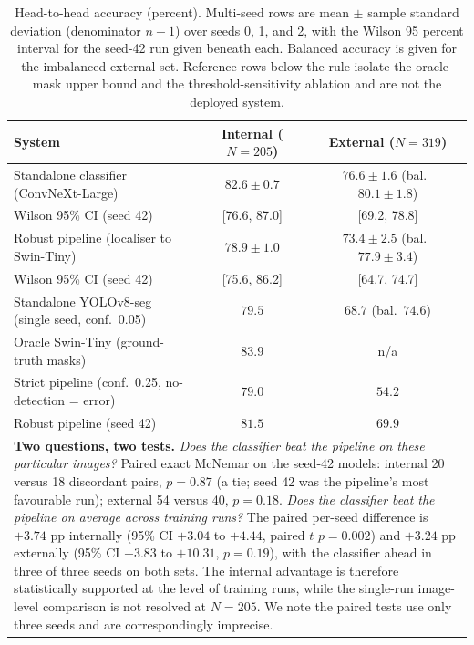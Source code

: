 \documentclass{elektr}
\newcommand{\vs}{\vspace}
\begin{document}
\begin{table}[!ht]
\caption{Head-to-head accuracy (percent). Multi-seed rows are mean $\pm$ sample standard deviation (denominator $n-1$) over seeds 0, 1, and 2, with the Wilson 95 percent interval for the seed-42 run given beneath each. Balanced accuracy is given for the imbalanced external set. Reference rows below the rule isolate the oracle-mask upper bound and the threshold-sensitivity ablation and are not the deployed system.}
\begin{center}
\small
\begin{tabular}{|l|c|c|}
\hline
System & Internal ($N=205$) & External ($N=319$) \\
\hline
Standalone classifier (ConvNeXt-Large) & $82.6 \pm 0.7$ & $76.6 \pm 1.6$ (bal.\ $80.1 \pm 1.8$) \\
\quad Wilson 95\% CI (seed 42) & [76.6, 87.0] & [69.2, 78.8] \\
Robust pipeline (localiser to Swin-Tiny) & $78.9 \pm 1.0$ & $73.4 \pm 2.5$ (bal.\ $77.9 \pm 3.4$) \\
\quad Wilson 95\% CI (seed 42) & [75.6, 86.2] & [64.7, 74.7] \\
Standalone YOLOv8-seg (single seed, conf.\ 0.05) & $79.5$ & $68.7$ (bal.\ $74.6$) \\
\hline
Oracle Swin-Tiny (ground-truth masks) & $83.9$ & n/a \\
Strict pipeline (conf.\ 0.25, no-detection = error) & $79.0$ & $54.2$ \\
Robust pipeline (seed 42) & $81.5$ & $69.9$ \\
\hline
\multicolumn{3}{|p{0.92\textwidth}|}{\textbf{Two questions, two tests.} \emph{Does the classifier beat the pipeline on these particular images?} Paired exact McNemar on the seed-42 models: internal 20 versus 18 discordant pairs, $p=0.87$ (a tie; seed 42 was the pipeline's most favourable run); external 54 versus 40, $p=0.18$. \emph{Does the classifier beat the pipeline on average across training runs?} The paired per-seed difference is $+3.74$ pp internally (95\% CI $+3.04$ to $+4.44$, paired $t$ $p=0.002$) and $+3.24$ pp externally (95\% CI $-3.83$ to $+10.31$, $p=0.19$), with the classifier ahead in three of three seeds on both sets. The internal advantage is therefore statistically supported at the level of training runs, while the single-run image-level comparison is not resolved at $N=205$. We note the paired tests use only three seeds and are correspondingly imprecise.} \\
\hline
\end{tabular}
\label{tab:h2h}
\end{center}\vs{-4mm}
\end{table}
\end{document}
